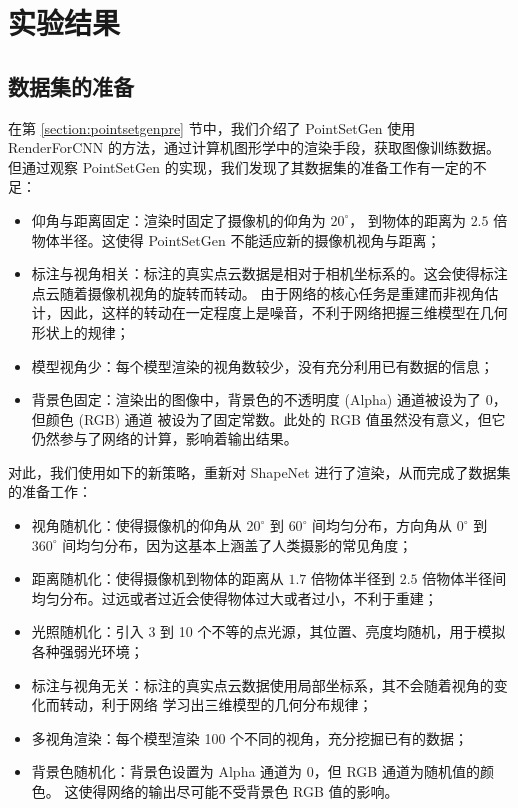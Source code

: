 \chapter{实验结果}
\label{cha:result}

\section{数据集的准备 \label{section:mypre}}
在第 \ref{section:pointsetgenpre} 节中，我们介绍了 PointSetGen
使用 RenderForCNN\cite{rendercnn} 的方法，通过计算机图形学中的渲染手段，获取图像训练数据。
但通过观察 PointSetGen 的实现，我们发现了其数据集的准备工作有一定的不足：
\begin{itemize}
	\item 仰角与距离固定：渲染时固定了摄像机的仰角为 $20^\circ$，%
	      到物体的距离为 $2.5$ 倍物体半径。这使得 PointSetGen 不能适应新的摄像机视角与距离；
	\item 标注与视角相关：标注的真实点云数据是相对于相机坐标系的。这会使得标注点云随着摄像机视角的旋转而转动。
	      由于网络的核心任务是重建而非视角估计，因此，这样的转动在一定程度上是噪音，不利于网络把握三维模型在几何形状上的规律；
	\item 模型视角少：每个模型渲染的视角数较少，没有充分利用已有数据的信息；
	\item 背景色固定：渲染出的图像中，背景色的不透明度 (Alpha) 通道被设为了 0，但颜色 (RGB) 通道 被设为了固定常数。此处的 RGB 值虽然没有意义，但它仍然参与了网络的计算，影响着输出结果。
\end{itemize}
对此，我们使用如下的新策略，重新对 ShapeNet\cite{shapenet} 进行了渲染，从而完成了数据集的准备工作：
\begin{itemize}
	\item 视角随机化：使得摄像机的仰角从 $20^\circ$ 到 $60^\circ$ 间均匀分布，方向角从 $0^\circ$ 到 $360^\circ$ 间均匀分布，因为这基本上涵盖了人类摄影的常见角度；

	\item 距离随机化：使得摄像机到物体的距离从 $1.7$ 倍物体半径到 $2.5$ 倍物体半径间均匀分布。过远或者过近会使得物体过大或者过小，不利于重建；

	\item 光照随机化：引入 3 到 10 个不等的点光源，其位置、亮度均随机，用于模拟各种强弱光环境；

	\item 标注与视角无关：标注的真实点云数据使用局部坐标系，其不会随着视角的变化而转动，利于网络
	      学习出三维模型的几何分布规律；

	\item 多视角渲染：每个模型渲染 100 个不同的视角，充分挖掘已有的数据；

	\item 背景色随机化：背景色设置为 Alpha 通道为 0，但 RGB 通道为随机值的颜色。
	      这使得网络的输出尽可能不受背景色 RGB 值的影响。
\end{itemize}

